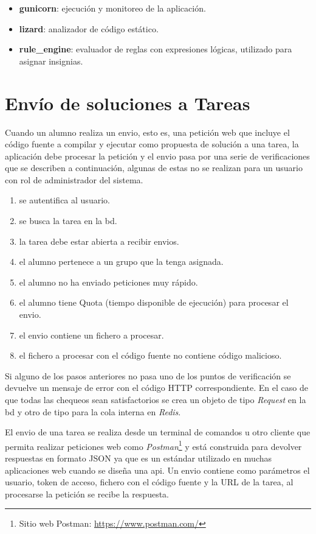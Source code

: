 \documentclass[11pt,spanish,listoffigures,listoftables]{tfgetsinf}
\begin{document}
\begin{itemize}
	\item \textbf{gunicorn}: ejecución y monitoreo de la aplicación.
	\item \textbf{lizard}: analizador de código estático.
	\item \textbf{rule\_engine}: evaluador de reglas con expresiones lógicas, utilizado para asignar \Gls{insignia}s.
\end{itemize}


\section{Envío de soluciones a Tareas}

Cuando un \Gls{alumno} realiza un \Gls{envio}, esto es, una petición web que incluye el código fuente a compilar y ejecutar como propuesta de solución a una \Gls{tarea}, la aplicación debe procesar la petición y el \Gls{envio} pasa por una serie de verificaciones que se describen a continuación, algunas de estas no se realizan para un usuario con rol de \gls{administrador} del sistema.

\begin{enumerate}
	\item se autentifica al usuario.
	\item se busca la \Gls{tarea} en la \Gls{bd}.
	\item la \Gls{tarea} debe estar abierta a recibir \Gls{envio}s.
	\item el \Gls{alumno} pertenece a un \Gls{grupo} que la tenga asignada.
	\item el \Gls{alumno} no ha enviado peticiones muy rápido.
	\item el \Gls{alumno} tiene Quota (tiempo disponible de ejecución) para procesar el \Gls{envio}.
	\item el \Gls{envio} contiene un fichero a procesar.
	\item el fichero a procesar con el código fuente no contiene código malicioso.
\end{enumerate}

Si alguno de los pasos anteriores no pasa uno de los puntos de verificación se devuelve un mensaje de error con el código HTTP correspondiente. En el caso de que todas las chequeos sean satisfactorios se crea un objeto de tipo \textit{Request} en la \acrshort{bd} y otro de tipo  para la \Gls{cola} interna en \textit{Redis}.

El \Gls{envio} de una \Gls{tarea} se realiza desde un terminal de comandos u otro cliente que permita realizar peticiones web como \textit{Postman}\footnote{Sitio web Postman: \url{https://www.postman.com/}} y está construida para devolver respuestas en formato JSON ya que es un estándar utilizado en muchas aplicaciones web cuando se diseña una \acrshort{api}. Un \Gls{envio} contiene como parámetros el usuario, token de acceso, fichero con el código fuente y la URL de la \Gls{tarea}, al procesarse la petición se recibe la respuesta.
\end{document}
